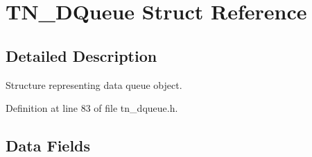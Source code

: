 \hypertarget{structTN__DQueue}{\section{T\+N\+\_\+\+D\+Queue Struct Reference}
\label{structTN__DQueue}
}


\subsection{Detailed Description}
Structure representing data queue object. 

Definition at line 83 of file tn\+\_\+dqueue.\+h.

\subsection*{Data Fields}
